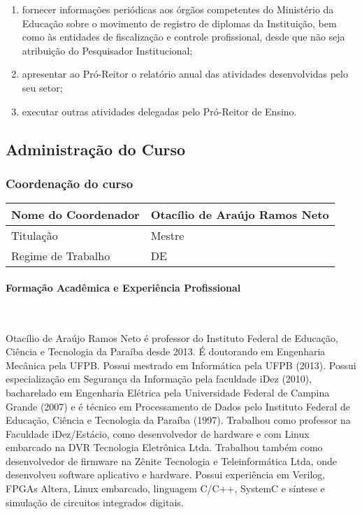 \begin{enumerate}
\item fornecer informações periódicas aos órgãos competentes do Ministério da Educação sobre o movimento de registro de diplomas da Instituição, bem como às entidades de fiscalização e controle profissional, desde que não seja atribuição do Pesquisador Institucional;

\item apresentar ao Pró-Reitor o relatório anual das atividades desenvolvidas pelo seu setor;

\item executar outras atividades delegadas pelo Pró-Reitor de Ensino.
\end{enumerate}

\subsection{Administra\c{c}\~ao do Curso}

\subsubsection{Coordena\c{c}\~ao do curso}

\begin{table}[h]
\begin{tabular}{|l|l|}
\hline
Nome do Coordenador & Otac\'ilio de Ara\'ujo Ramos Neto \\ \hline
Titulação           & Mestre                             \\ \hline
Regime de Trabalho  & DE                                 \\ \hline
\end{tabular}
\end{table}

\paragraph{Forma\c{c}\~ao Acad\^emica e Experi\^encia Profissional}\

Otac\'ilio de Ara\'ujo Ramos Neto \'e professor do Instituto Federal de Educação, Ciência e Tecnologia da Paraíba desde 2013. É doutorando em Engenharia Mecânica pela UFPB. Possui mestrado em Informática pela UFPB (2013). Possui especialização em Segurança da Informação pela faculdade iDez (2010), bacharelado em Engenharia Elétrica pela Universidade Federal de Campina Grande (2007) e é técnico em Processamento de Dados pelo Instituto Federal de Educação, Ci\^encia e Tecnologia da Paraíba (1997). Trabalhou como professor na Faculdade iDez/Estácio, como desenvolvedor de hardware e com Linux embarcado na DVR Tecnologia Eletrônica Ltda. Trabalhou também como desenvolvedor de firmware na Zênite Tecnologia e Teleinformática Ltda, onde desenvolveu software aplicativo e hardware. Possui experiência em Verilog, FPGAs Altera, Linux embarcado, linguagem C/C++, SystemC e síntese e simulação de circuitos integrados digitais. 

